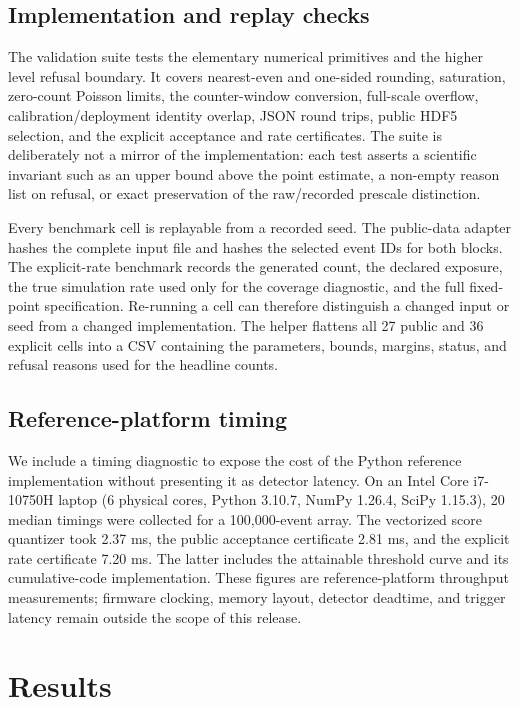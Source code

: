 \documentclass[submission, Phys]{SciPost}
\begin{document}
\subsection{Implementation and replay checks}

The validation suite tests the elementary numerical primitives and the higher
level refusal boundary.  It covers nearest-even and one-sided rounding,
saturation, zero-count Poisson limits, the counter-window conversion, full-scale
overflow, calibration/deployment identity overlap, JSON round trips, public
HDF5 selection, and the explicit acceptance and rate certificates.  The suite
is deliberately not a mirror of the implementation: each test asserts a
scientific invariant such as an upper bound above the point estimate, a
non-empty reason list on refusal, or exact preservation of the raw/recorded
prescale distinction.

Every benchmark cell is replayable from a recorded seed.  The public-data
adapter hashes the complete input file and hashes the selected event IDs for
both blocks.  The explicit-rate benchmark records the generated count, the
declared exposure, the true simulation rate used only for the coverage
diagnostic, and the full fixed-point specification.  Re-running a cell can
therefore distinguish a changed input or seed from a changed implementation.
The helper  flattens all 27 public and 36 explicit
cells into a CSV containing the parameters, bounds, margins, status, and refusal
reasons used for the headline counts.

\subsection{Reference-platform timing}

We include a timing diagnostic to expose the cost of the Python reference
implementation without presenting it as detector latency.  On an Intel
Core i7-10750H laptop (6 physical cores, Python 3.10.7, NumPy 1.26.4, SciPy
1.15.3), 20 median timings were collected for a 100,000-event array.  The
vectorized score quantizer took 2.37 ms, the public acceptance certificate
2.81 ms, and the explicit rate certificate 7.20 ms.  The latter includes the
attainable threshold curve and its cumulative-code implementation.  These
figures are reference-platform throughput measurements; firmware clocking,
memory layout, detector deadtime, and trigger latency remain outside the
scope of this release.

\section{Results}
\label{sec:results}
\end{document}
